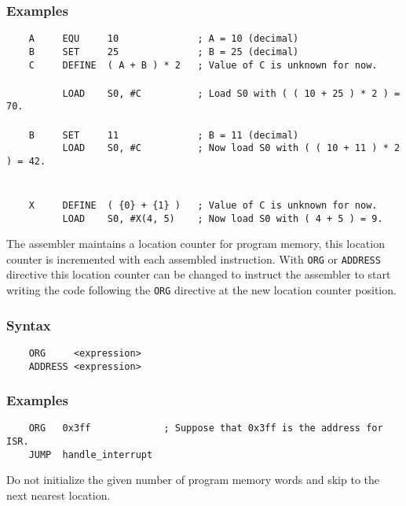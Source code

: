     \subsubsection{Examples}
        \verb'    A     EQU     10              ; A = 10 (decimal)'\\
        \verb'    B     SET     25              ; B = 25 (decimal)'\\
        \verb'    C     DEFINE  ( A + B ) * 2   ; Value of C is unknown for now.'\\
        \verb''\\
        \verb'          LOAD    S0, #C          ; Load S0 with ( ( 10 + 25 ) * 2 ) = 70.'\\
        \verb''\\
        \verb'    B     SET     11              ; B = 11 (decimal)'\\
        \verb'          LOAD    S0, #C          ; Now load S0 with ( ( 10 + 11 ) * 2 ) = 42.'\\
        \verb''\\
        \verb''\\
        \verb'    X     DEFINE  ( {0} + {1} )   ; Value of C is unknown for now.'\\
        \verb'          LOAD    S0, #X(4, 5)    ; Now load S0 with ( 4 + 5 ) = 9.'

    The assembler maintains a location counter for program memory, this location counter is incremented with each assembled instruction. With \texttt{ORG} or \texttt{ADDRESS} directive this location counter can be changed to instruct the assembler to start writing the code following the \texttt{ORG} directive at the new location counter position.

    \subsubsection{Syntax}
        \verb'    ORG     <expression>'\\
        \verb'    ADDRESS <expression>'


    \subsubsection{Examples}
        \verb'    ORG   0x3ff             ; Suppose that 0x3ff is the address for ISR.'\\
        \verb'    JUMP  handle_interrupt'

\clearpage
{}
    Do not initialize the given number of program memory words and skip to the next nearest location.

